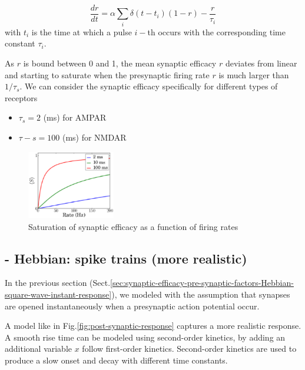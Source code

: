 \begin{equation}
\frac{dr}{dt} = \alpha \sum_i \delta(t-t_i) (1-r) - \frac{r}{\tau_i}
\end{equation}
with $t_i$ is the time at which a pulse $i-$th occurs with the corresponding
time constant $\tau_i$.

As $r$ is bound between 0 and 1, the mean synaptic efficacy $r$ deviates from
linear and starting to saturate when the presynaptic firing rate $r$ is much
larger than $1/\tau_s$. We can consider the synaptic efficacy specifically for
different types of receptors
\begin{itemize}
  \item $\tau_s = 2	$ (ms) for AMPAR
  \item $\tau-s = 100$ (ms) for NMDAR
\end{itemize}

\begin{figure}[hbt]
  \centerline{\includegraphics[height=3cm,
    angle=0]{./images/synaptic-efficacy-presynaptic-firing-rates.eps}}
\caption{Saturation of synaptic efficacy as a function of firing rates}
\label{fig:synaptic-efficacy-presynaptic-firing-rates}
\end{figure}




\subsection{- Hebbian: spike trains (more realistic)}

In the previous section
(Sect.\ref{sec:synaptic-efficacy-pre-synaptic-factors-Hebbian-square-wave-instant-response}),
we modeled with the assumption that synapses are opened instantaneously when a
presynaptic action potential occur.

A model like in Fig.\ref{fig:post-synaptic-response} captures a more realistic
response. A smooth rise time can be modeled using second-order kinetics, by
adding an additional variable $x$ follow first-order kinetics.
Second-order kinetics are used to produce a slow onset and decay with different
time constants.

